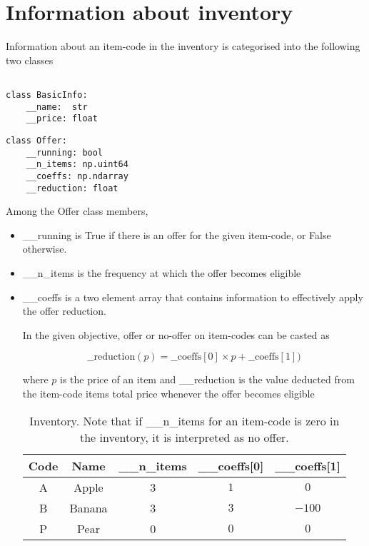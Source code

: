 \documentclass[11pt,a4paper,oneside,onecolumn]{article}
\begin{document}
\section{Information about inventory}

Information about an item-code in the inventory is categorised into the following two classes
\begin{multicols}{2}

\begin{verbatim}

class BasicInfo:
    __name:  str
    __price: float

\end{verbatim}

\vfill

\begin{verbatim}
class Offer:
    __running: bool
    __n_items: np.uint64
    __coeffs: np.ndarray
    __reduction: float

\end{verbatim}

\end{multicols}

Among the Offer class members,
\begin{itemize}
\item{
\_\_running is True if there is an offer for the given item-code, or False otherwise.
}
\item{\_\_n\_items is the frequency at which the offer becomes eligible}
\item{\_\_coeffs is a two element array that contains information to effectively
	apply the offer reduction.

In the given objective, offer or no-offer on item-codes can be casted as

\begin{equation}
\_\_\mathrm{reduction}(p) = \_\_\mathrm{coeffs[0]}\times p+\_\_\mathrm{coeffs[1]})
\end{equation}

where $p$ is the price of an item and \_\_reduction is the value deducted from the
 item-code items total price whenever the offer becomes eligible}

\begin{table}[h]
\begin{center}
\begin{tabular}{ c c c c c }
 \toprule
 Code & Name & \_\_n\_items & \_\_coeffs[0] & \_\_coeffs[1] \\
 \midrule
 \midrule
 A & Apple & 3 & $1$ & $0$ \\
 B & Banana & 3 & $3$ & $-100$ \\
 P & Pear & 0 & $0$ & $0$ \\
 \bottomrule
\end{tabular}
\end{center}
\caption{Inventory. Note that if \_\_n\_items for an item-code is zero in the inventory,
	it is interpreted as no offer.}
\label{tbl:inventory}
\end{table}

\end{itemize}
\end{document}
